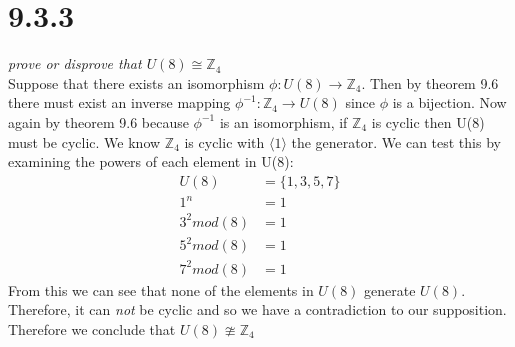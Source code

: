 \documentclass[a4paper, 11pt]{article}
\begin{document}
\section*{9.3.3}
\textit{prove or disprove that $U(8)\cong \mathbb{Z}_4$}\\ 

Suppose that there exists an isomorphism $\phi: U(8) \rightarrow \mathbb{Z}_4$. Then by theorem 9.6 there must exist an inverse mapping $\phi^{-1}: \mathbb{Z}_4 \rightarrow U(8)$ since $\phi$ is a bijection. Now again by theorem 9.6 because $\phi^{-1}$ is an isomorphism, if $\mathbb{Z}_4$ is cyclic then U(8) must be cyclic. We know $\mathbb{Z}_4$ is cyclic with $\langle 1 \rangle$ the generator. We can test this by examining the powers of each element in U(8):
	\begin{align*}
		U(8) &= \{1, 3, 5, 7\} \\ 
		 1^n &= 1 \\ 
		 3^2 mod(8) &= 1 \\ 
		 5^2 mod(8) &= 1 \\ 
		 7^2 mod(8) &= 1 
	\end{align*}
From this we can see that none of the elements in $U(8)$ generate $U(8)$. Therefore, it can \textit{not} be cyclic and so we have a contradiction to our supposition. Therefore we conclude that $U(8) \ncong \mathbb{Z}_4$
\end{document}
